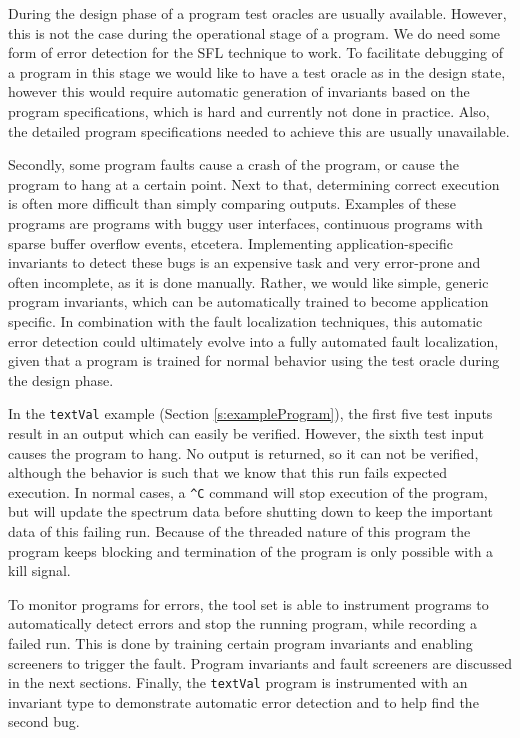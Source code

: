 
During the design phase of a program test oracles are usually available.
However, this is not the case during the operational stage of a program.
We do need some form of error detection for the SFL technique to work.
To facilitate debugging of a program in this stage we would like to have
a test oracle as in the design state, however this would require automatic
generation of invariants based on the program specifications, which is 
hard and currently not done in practice.
Also, the detailed program specifications needed to achieve this are usually
unavailable.

Secondly, some program faults cause a crash of the program,
or cause the program to hang at a certain point.
Next to that, determining correct execution is often more difficult than simply comparing outputs.
Examples of these programs are programs with buggy user interfaces,
continuous programs with sparse buffer overflow events, etcetera.
Implementing application-specific invariants to detect these bugs is an expensive task 
and very error-prone and often incomplete, as it is done manually.
Rather, we would like simple, generic program invariants,
which can be automatically trained to become application specific.
In combination with the fault localization techniques, 
this automatic error detection could ultimately evolve into
a fully automated fault localization,
given that a program is trained for normal behavior using the test oracle
during the design phase.


In the \verb|textVal| example (Section \ref{s:exampleProgram}), 
the first five test inputs result in an output which can easily be verified.
However, the sixth test input causes the program to hang.
No output is returned, so it can not be verified, 
although the behavior is such that we know that this run fails expected execution.
In normal cases, a \verb|^C| command will stop execution of the program,
but will update the spectrum data before shutting down to keep the important data of this failing run.
Because of the threaded nature of this program the program keeps blocking
and termination of the program is only possible with a kill signal.

To monitor programs for errors, the tool set is able to instrument programs to
automatically detect errors and stop the running program, while recording a failed run.
This is done by training certain program invariants and enabling screeners to trigger the fault.
Program invariants and fault screeners are discussed in the next sections.
Finally, the \verb|textVal| program is instrumented with an invariant type 
to demonstrate automatic error detection and to help find the second bug.


